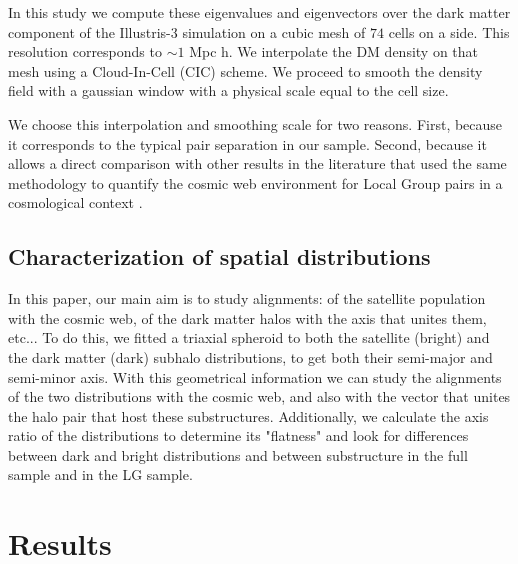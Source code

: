 In this study we compute these eigenvalues and eigenvectors over the
dark matter component of the Illustris-3 simulation on a cubic mesh of
$74$ cells on a side. 
This resolution corresponds to $\sim 1$ Mpc h.
We interpolate the DM density on that mesh using a Cloud-In-Cell (CIC)
scheme. 
We proceed to smooth the density field with a gaussian window with a
physical scale equal to the cell size. 

We choose this interpolation and smoothing scale for two reasons.
First, because it corresponds to the typical pair separation in our
sample.
Second, because it allows a direct comparison with other results in
the literature that used the same methodology to quantify the cosmic
web environment for Local Group pairs in a cosmological context
\citep{ForeroRomero2013,2015ApJ...799...45F}.  

\subsection{Characterization of spatial distributions}
\label{Method}
In this paper, our main aim is to study alignments: of the
satellite population with the cosmic web, of the dark matter halos
with the axis that unites them, etc... 
To do this, we fitted a triaxial spheroid to both the satellite (bright) and the dark matter (dark) subhalo distributions, to get both their semi-major and semi-minor axis. 
With this geometrical information we can study the alignments of the two distributions with the cosmic web, and also with the vector that unites the halo pair that host these substructures.
Additionally, we calculate the axis ratio of the distributions to determine its "flatness" and look for differences between dark and bright distributions and between substructure in the full sample and in the LG sample.

\section{Results}
\label{Results}


